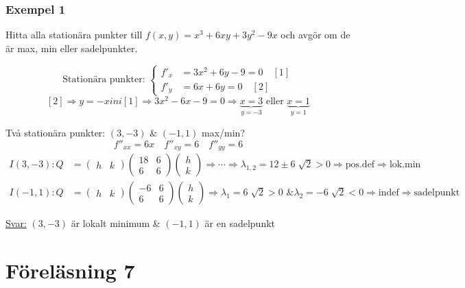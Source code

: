 \documentclass{article}
\let\oldsqrt\sqrt
\renewcommand*{\sqrt}[2][\ ]{\oldsqrt[#1]{#2} }
\begin{document}
\subsubsection{Exempel 1}
Hitta alla stationära punkter till $f(x,y) = x^3 + 6xy + 3y^2 - 9x$ och avgör om de är max, min eller sadelpunkter.

$$
	\text{Stationära punkter: }
	\left\{
	\begin{align}
	f'_x &= 3x^2 + 6y - 9 = 0 \quad [1] \\
	f'_y &= 6x + 6y = 0 \quad [2]
	\end{align}\right.
$$
$$
	[2] \Rightarrow y = -x in i [1] \Rightarrow 3x^2 - 6x - 9 = 0 \Rightarrow \underbrace{x=3}_{y=-3} \text{ eller } \underbrace{x=1}_{y=1}
$$

Två stationära punkter: $(3,-3)$ \& $(-1,1)$ max/min?
$$
	f''_{xx} = 6x \quad f''_{xy} = 6 \quad f''_{yy} = 6
$$
\begin{align*}
	I(3,-3): Q &= 
	\begin{pmatrix}
		h & k
	\end{pmatrix}
	\begin{pmatrix}
		18 & 6 \\
		6 & 6
	\end{pmatrix}
	\begin{pmatrix}
		h \\ 
		k
	\end{pmatrix}
	\Rightarrow \cdots \Rightarrow \lambda_{1,2} = 12 \pm 6\sqrt{2} > 0 \Rightarrow \text{pos.def} \Rightarrow \text{lok.min} \\
	I(-1,1): Q &= 
	\begin{pmatrix}
		h & k
	\end{pmatrix}
	\begin{pmatrix}
		-6 & 6 \\
		6 & 6
	\end{pmatrix}
	\begin{pmatrix}
		h \\ 
		k
	\end{pmatrix}
	\Rightarrow \lambda_1 = 6\sqrt{2} > 0 \text{ \& } \lambda_2 = -6\sqrt{2} < 0 \Rightarrow \text{indef} \Rightarrow \text{sadelpunkt}
\end{align*}

\underline{Svar:} $(3,-3)$ är lokalt minimum \& $(-1,1)$ är en sadelpunkt





\newpage
\section{Föreläsning 7}
\end{document}
